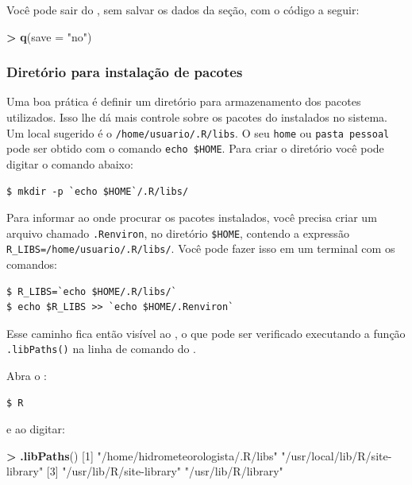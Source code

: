 \documentclass[]{book}
\newenvironment{Shaded}{\begin{snugshade}}{\end{snugshade}}
\newcommand{\KeywordTok}[1]{\textcolor[rgb]{0.13,0.29,0.53}{\textbf{#1}}}
\newcommand{\DataTypeTok}[1]{\textcolor[rgb]{0.13,0.29,0.53}{#1}}
\newcommand{\DecValTok}[1]{\textcolor[rgb]{0.00,0.00,0.81}{#1}}
\newcommand{\StringTok}[1]{\textcolor[rgb]{0.31,0.60,0.02}{#1}}
\newcommand{\OperatorTok}[1]{\textcolor[rgb]{0.81,0.36,0.00}{\textbf{#1}}}
\newcommand{\NormalTok}[1]{#1}
\begin{document}
Você pode sair do , sem salvar os dados da seção, com o código a seguir:

\begin{Shaded}
\begin{Highlighting}[]
\OperatorTok{>}\StringTok{ }\KeywordTok{q}\NormalTok{(}\DataTypeTok{save =} \StringTok{"no"}\NormalTok{)}
\end{Highlighting}
\end{Shaded}

\subsubsection{Diretório para instalação de
pacotes}\label{diretorio-para-instalacao-de-pacotes}

Uma boa prática é definir um diretório para armazenamento dos pacotes
utilizados. Isso lhe dá mais controle sobre os pacotes do instalados no
sistema. Um local sugerido é o \texttt{/home/usuario/.R/libs}. O seu
\texttt{home} ou \texttt{pasta\ pessoal} pode ser obtido com o comando
\texttt{echo\ \$HOME}. Para criar o diretório você pode digitar o
comando abaixo:

\begin{verbatim}
$ mkdir -p `echo $HOME`/.R/libs/
\end{verbatim}

Para informar ao onde procurar os pacotes instalados, você precisa criar
um arquivo chamado \texttt{.Renviron}, no diretório \texttt{\$HOME},
contendo a expressão \texttt{R\_LIBS=/home/usuario/.R/libs/}. Você pode
fazer isso em um terminal com os comandos:

\begin{verbatim}
$ R_LIBS=`echo $HOME/.R/libs/`
$ echo $R_LIBS >> `echo $HOME/.Renviron`
\end{verbatim}

Esse caminho fica então visível ao , o que pode ser verificado
executando a função \texttt{.libPaths()} na linha de comando do .

Abra o :

\begin{verbatim}
$ R
\end{verbatim}

e ao digitar:

\begin{Shaded}
\begin{Highlighting}[]
\OperatorTok{>}\StringTok{ }\KeywordTok{.libPaths}\NormalTok{()}
\NormalTok{[}\DecValTok{1}\NormalTok{] }\StringTok{"/home/hidrometeorologista/.R/libs"} \StringTok{"/usr/local/lib/R/site-library"}    
\NormalTok{[}\DecValTok{3}\NormalTok{] }\StringTok{"/usr/lib/R/site-library"}           \StringTok{"/usr/lib/R/library"}               
\end{Highlighting}
\end{Shaded}
\end{document}
